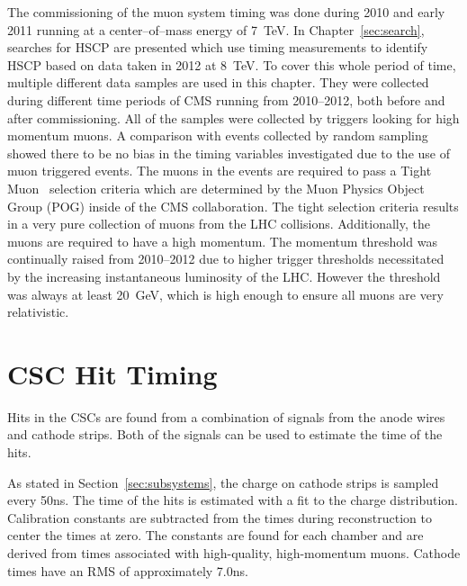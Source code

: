 The commissioning of the muon system timing was done during 2010 and early 2011 running at a center--of--mass energy of 7~TeV.
In Chapter~\ref{sec:search}, searches for HSCP are presented which use
timing measurements to identify HSCP based on data taken in 2012 at 8~TeV.
To cover this whole period of time,
multiple different data samples are used in this chapter. They were collected during different time periods of CMS running from 2010--2012, both before and after commissioning.
All of the samples were collected by triggers looking for high momentum muons. A comparison with events collected by random sampling showed there to be no
bias in the timing variables investigated due to the use of muon triggered events.
The muons in the events are required to pass a Tight Muon~\cite{2012JInst...7P0002T} selection 
criteria which are determined by the Muon Physics Object Group (POG) inside of the CMS collaboration.
The tight selection criteria results in a very pure collection of muons from the LHC collisions.
Additionally, the muons are required to have a high momentum. The momentum threshold was continually raised from 2010--2012 due to higher trigger thresholds
necessitated by the increasing instantaneous luminosity of the LHC.
However the threshold was always at least 20~GeV, which is high enough to ensure all muons are very relativistic.

\section{CSC Hit Timing}
Hits in the CSCs are found from a combination of signals from the anode wires and cathode strips. Both of the signals can be used to estimate the time of the hits.

As stated in Section~\ref{sec:subsystems}, the charge on cathode strips is sampled every 50ns.
The time of the hits is estimated with a fit to the charge distribution. Calibration constants are subtracted from the times during reconstruction to center the times at zero.
The constants are found for each chamber and are derived from times associated with high-quality, high-momentum muons. Cathode times have an RMS of approximately 7.0ns.

